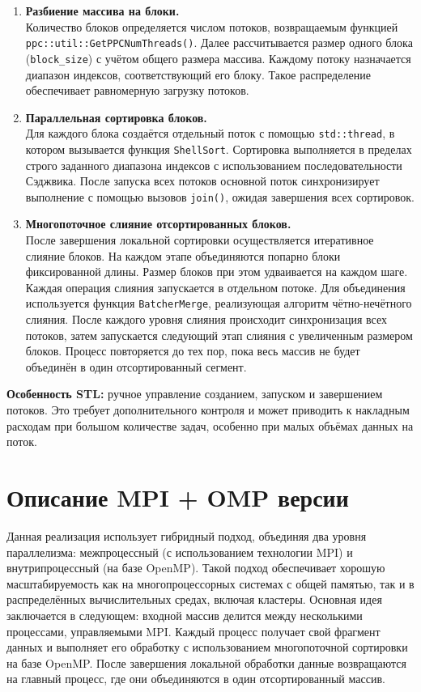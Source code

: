 \documentclass[a4paper,12pt]{article}
\begin{document}
\begin{enumerate}
    \item \textbf{Разбиение массива на блоки.} \\
    Количество блоков определяется числом потоков, возвращаемым функцией \texttt{ppc::util::GetPPCNumThreads()}. Далее рассчитывается размер одного блока (\texttt{block\_size}) с учётом общего размера массива. Каждому потоку назначается диапазон индексов, соответствующий его блоку. Такое распределение обеспечивает равномерную загрузку потоков.

    \item \textbf{Параллельная сортировка блоков.} \\
    Для каждого блока создаётся отдельный поток с помощью \texttt{std::thread}, в котором вызывается функция \texttt{ShellSort}. Сортировка выполняется в пределах строго заданного диапазона индексов с использованием последовательности Сэджвика. После запуска всех потоков основной поток синхронизирует выполнение с помощью вызовов \texttt{join()}, ожидая завершения всех сортировок.

    \item \textbf{Многопоточное слияние отсортированных блоков.} \\
    После завершения локальной сортировки осуществляется итеративное слияние блоков. На каждом этапе объединяются попарно блоки фиксированной длины. Размер блоков при этом удваивается на каждом шаге. Каждая операция слияния запускается в отдельном потоке. Для объединения используется функция \texttt{BatcherMerge}, реализующая алгоритм чётно-нечётного слияния. После каждого уровня слияния происходит синхронизация всех потоков, затем запускается следующий этап слияния с увеличенным размером блоков. Процесс повторяется до тех пор, пока весь массив не будет объединён в один отсортированный сегмент.
\end{enumerate}
\textbf{Особенность STL:} ручное управление созданием, запуском и завершением потоков. Это требует дополнительного контроля и может приводить к накладным расходам при большом количестве задач, особенно при малых объёмах данных на поток.
\newpage

\section{Описание MPI + OMP версии}
Данная реализация использует гибридный подход, объединяя два уровня параллелизма: межпроцессный (с использованием технологии MPI) и внутрипроцессный (на базе OpenMP). Такой подход обеспечивает хорошую масштабируемость как на многопроцессорных системах с общей памятью, так и в распределённых вычислительных средах, включая кластеры.
Основная идея заключается в следующем: входной массив делится между несколькими процессами, управляемыми MPI. Каждый процесс получает свой фрагмент данных и выполняет его обработку с использованием многопоточной сортировки на базе OpenMP. После завершения локальной обработки данные возвращаются на главный процесс, где они объединяются в один отсортированный массив.
\end{document}
